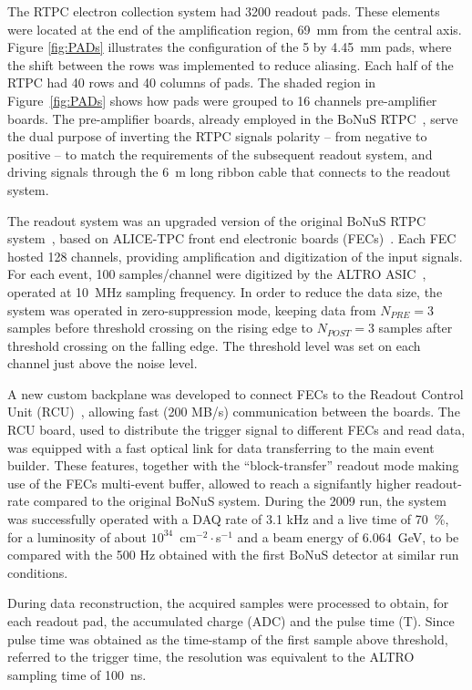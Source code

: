 \documentclass[preprint,5p]{elsarticle}
\begin{document}
The RTPC electron collection system had 3200 readout pads. These elements were
located at the end of the amplification region, 69~mm from the central axis.
Figure \ref{fig:PADs} illustrates the configuration of the 5 by 4.45~mm pads,
where the shift between the rows was implemented to reduce aliasing. Each half 
of the RTPC had 40 rows and 40 columns of pads. The shaded region in 
Figure~\ref{fig:PADs} shows how pads were grouped to 16 channels pre-amplifier 
boards. The pre-amplifier boards, already employed in the BoNuS 
RTPC~\cite{Fenker:2008zz}, serve the dual purpose of inverting the RTPC signals 
polarity -- from negative to positive -- to match the requirements of the 
subsequent readout system, and driving signals through the 6~m long ribbon 
cable that connects to the readout system.

The readout system was an upgraded version of the original BoNuS RTPC 
system~\cite{Fenker:2008zz}, based on ALICE-TPC front end electronic boards 
(FECs)~\cite{ALICE-FEE}.  Each FEC hosted 128 channels, providing amplification 
and digitization of the input signals. For each event, 100 samples/channel were 
digitized by the ALTRO ASIC~\cite{EsteveBosch:2003bj}, operated at 10~MHz 
sampling frequency. In order to reduce the data size, the system was operated 
in zero-suppression mode, keeping data from $N_{PRE}=3$ samples before 
threshold crossing on the rising edge to $N_{POST}=3$ samples after threshold 
crossing on the falling edge.  The threshold level was set on each channel just 
above the noise level.

A new custom backplane was developed to connect FECs to the Readout Control 
Unit (RCU)~\cite{RCU}, allowing fast (200 MB/s) communication between the 
boards. The RCU board, used to distribute the trigger signal to different FECs 
and read data, was equipped with a fast optical link for data transferring to 
the main event builder. These features, together with the ``block-transfer'' 
readout mode making use of the FECs multi-event buffer, allowed to reach a 
signifantly higher readout-rate compared to the original BoNuS system. During 
the 2009 run, the system was successfully operated with a DAQ rate of 3.1 kHz 
and a live time of 70~\%, for a luminosity of about 
$10^{34}$~cm$^{-2}\cdot$s$^{-1}$ and a beam energy of 6.064~GeV, to be compared 
with the 500 Hz obtained with the first BoNuS detector at similar run 
conditions.

During data reconstruction, the acquired samples were processed to obtain, 
for each readout pad, the accumulated charge (ADC) and the pulse time (T). Since 
pulse time was obtained as the time-stamp of the first sample above threshold, 
referred to the trigger time, the resolution was equivalent to the ALTRO 
sampling time of 100~ns.
\end{document}

